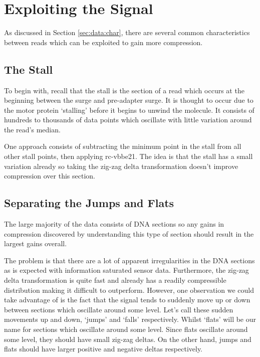 \section{Exploiting the Signal}

As discussed in Section
\ref{sec:data:char},
there are several common characteristics between reads which can be exploited to gain more compression.

\subsection{The Stall}

To begin with, recall that the stall is the section of a read which occurs at the beginning between the surge and pre-adapter surge. It is thought to occur due to the motor protein `stalling' before it begins to unwind the molecule.
It consists of hundreds to thousands of data points which oscillate with little variation around the read's median.

One approach consists of subtracting the minimum point in the stall from all other stall points, then applying rc-vbbe21. The idea is that the stall has a small variation already so taking the zig-zag delta transformation doesn't improve compression over this section.

\subsection{Separating the Jumps and Flats}

The large majority of the data consists of DNA sections so any gains in
compression discovered by understanding this type of section should
result in the largest gains overall.

The problem is that there are a lot of apparent irregularities in the DNA
sections as is expected with information saturated sensor data. Furthermore, the
zig-zag delta transformation is quite fast and already has a readily
compressible distribution making it difficult to outperform. However, one
observation we could take advantage of is the fact that the signal tends to
suddenly move up or down between sections which oscillate around some level.
Let's call these sudden movements up and down, `jumps' and `falls' respectively.
Whilst `flats' will be our name for sections which oscillate around some level.
Since flats oscillate around some level, they should have small zig-zag deltas.
On the other hand, jumps and flats should have larger positive and negative
deltas respectively.

